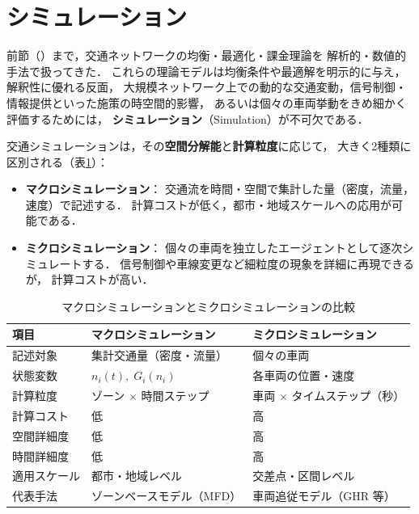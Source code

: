 
\section{シミュレーション}
\label{sec:ch9-simulation}

前節（）まで，交通ネットワークの均衡・最適化・課金理論を
解析的・数値的手法で扱ってきた．
これらの理論モデルは均衡条件や最適解を明示的に与え，解釈性に優れる反面，
大規模ネットワーク上での動的な交通変動，信号制御・情報提供といった施策の時空間的影響，
あるいは個々の車両挙動をきめ細かく評価するためには，
\textbf{シミュレーション}（Simulation）が不可欠である．

交通シミュレーションは，その\textbf{空間分解能}と\textbf{計算粒度}に応じて，
大きく2種類に区別される（表\ref{tab:sim-comparison}）：

\begin{itemize}
  \item \textbf{マクロシミュレーション}：
    交通流を時間・空間で集計した量（密度，流量，速度）で記述する．
    計算コストが低く，都市・地域スケールへの応用が可能である．
  \item \textbf{ミクロシミュレーション}：
    個々の車両を独立したエージェントとして逐次シミュレートする．
    信号制御や車線変更など細粒度の現象を詳細に再現できるが，
    計算コストが高い．
\end{itemize}

\begin{table}[htbp]
  \centering
  \caption{マクロシミュレーションとミクロシミュレーションの比較}
  \label{tab:sim-comparison}
  \begin{tabular}{lll}
    \toprule
    項目 & マクロシミュレーション & ミクロシミュレーション \\
    \midrule
    記述対象      & 集計交通量（密度・流量） & 個々の車両 \\
    状態変数      & $n_i(t),\; G_i(n_i)$     & 各車両の位置・速度 \\
    計算粒度      & ゾーン $\times$ 時間ステップ & 車両 $\times$ タイムステップ（秒） \\
    計算コスト    & 低                         & 高 \\
    空間詳細度    & 低                         & 高 \\
    時間詳細度    & 低                         & 高 \\
    適用スケール  & 都市・地域レベル           & 交差点・区間レベル \\
    代表手法      & ゾーンベースモデル（MFD）  & 車両追従モデル（GHR 等） \\
    \bottomrule
  \end{tabular}
\end{table}

